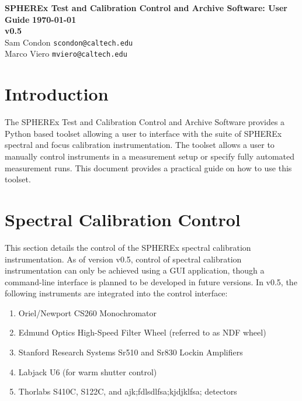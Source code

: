 \documentclass{article}
\newcommand{\version}{v0.5}
\begin{document}
	\begin{center}
		{\Large\bf SPHEREx Test and Calibration Control and Archive Software: User Guide}
		\vskip 0.25in
		{\large\bf \today} \\
		{\large\bf \version} \\
		\vskip 0.25in
		Sam Condon \texttt{scondon@caltech.edu} \\
		Marco Viero \texttt{mviero@caltech.edu} 
		\vskip 0.125in
	\end{center}
	
\section*{Introduction}

  The SPHEREx Test and Calibration Control and Archive Software provides a Python based toolset allowing a user to interface with the suite of SPHEREx spectral and focus calibration instrumentation. The toolset allows a user to manually control instruments in a measurement setup or specify fully automated measurement runs. This document provides a practical guide on how to use this toolset.

\tableofcontents


\section{Spectral Calibration Control}

This section details the control of the SPHEREx spectral calibration instrumentation. As of version \version, control of spectral calibration instrumentation can only be achieved using a GUI application, though a command-line interface is planned to be developed in future versions. In \version, the following instruments are integrated into the control interface:

\begin{enumerate}
\item Oriel/Newport CS260 Monochromator \\
\item Edmund Optics High-Speed Filter Wheel (referred to as NDF wheel) \\
\item Stanford Research Systems Sr510 and Sr830 Lockin Amplifiers \\
\item Labjack U6 (for warm shutter control) \\
\item Thorlabs S410C, S122C, and ajk;fdlsdlfsa;kjdjklfsa; detectors
\end{enumerate}
\end{document}
